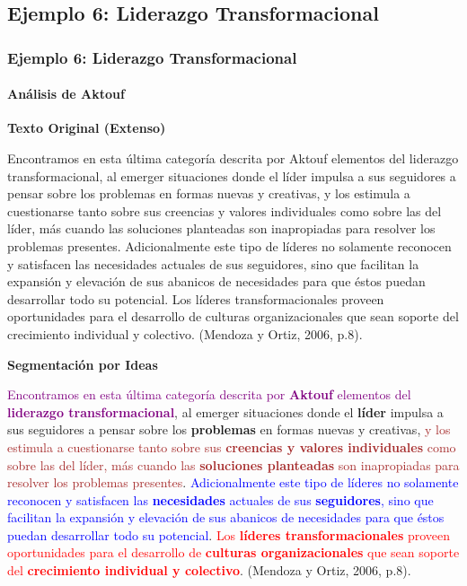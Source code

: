 \documentclass[aspectratio=169]{beamer}
\begin{document}
\subsection{Ejemplo 6: Liderazgo Transformacional}

\begin{frame}[allowframebreaks]
	\frametitle{Ejemplo 6: Liderazgo Transformacional}
	\framesubtitle{Análisis de Aktouf}
	
	\textbf{Texto Original (Extenso)}
	\begin{block}{}
		\tiny
		Encontramos en esta última categoría descrita por Aktouf elementos del liderazgo transformacional, al emerger situaciones donde el líder impulsa a sus seguidores a pensar sobre los problemas en formas nuevas y creativas, y los estimula a cuestionarse tanto sobre sus creencias y valores individuales como sobre las del líder, más cuando las soluciones planteadas son inapropiadas para resolver los problemas presentes. Adicionalmente este tipo de líderes no solamente reconocen y satisfacen las necesidades actuales de sus seguidores, sino que facilitan la expansión y elevación de sus abanicos de necesidades para que éstos puedan desarrollar todo su potencial. Los líderes transformacionales proveen oportunidades para el desarrollo de culturas organizacionales que sean soporte del crecimiento individual y colectivo. (Mendoza y Ortiz, 2006, p.8).
	\end{block}
	
	\framebreak
	
	\textbf{Segmentación por Ideas}
	\begin{block}{}
		\tiny
		\textcolor{purple}{Encontramos en esta última categoría descrita por \textbf{Aktouf} elementos del \textbf{liderazgo transformacional}}, al emerger situaciones donde el \textbf{líder} impulsa a sus seguidores a pensar sobre los \textbf{problemas} en formas nuevas y creativas, \textcolor{brown}{y los estimula a cuestionarse tanto sobre sus \textbf{creencias y valores individuales} como sobre las del líder, más cuando las \textbf{soluciones planteadas} son inapropiadas para resolver los problemas presentes}. \textcolor{blue}{Adicionalmente este tipo de líderes no solamente reconocen y satisfacen las \textbf{necesidades} actuales de sus \textbf{seguidores}, sino que facilitan la expansión y elevación de sus abanicos de necesidades para que éstos puedan desarrollar todo su potencial}. \textcolor{red}{Los \textbf{líderes transformacionales} proveen oportunidades para el desarrollo de \textbf{culturas organizacionales} que sean soporte del \textbf{crecimiento individual y colectivo}}. (Mendoza y Ortiz, 2006, p.8).
	\end{block}
	

\end{frame}
\end{document}
